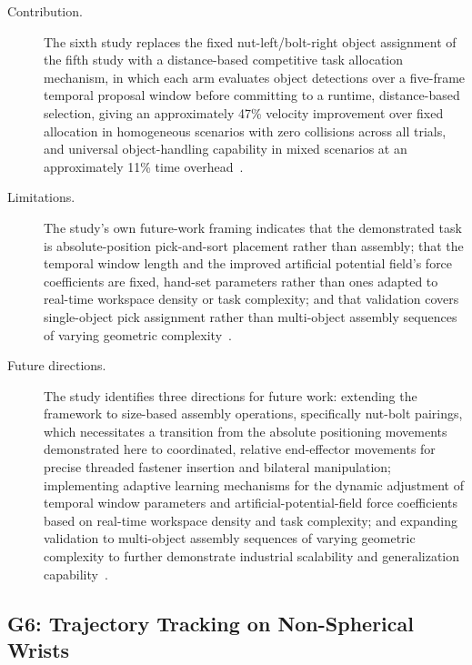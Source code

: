 \begin{description}
    \item[Contribution.] The sixth study replaces the fixed nut-left/bolt-right object assignment of
    the fifth study with a distance-based competitive task allocation mechanism, in which each arm
    evaluates object detections over a five-frame temporal proposal window before committing to a
    runtime, distance-based selection, giving an approximately 47\% velocity improvement over fixed
    allocation in homogeneous scenarios with zero collisions across all trials, and universal
    object-handling capability in mixed scenarios at an approximately 11\% time
    overhead~\citep{sk2025competitive}.

    \item[Limitations.] The study's own future-work framing indicates that the demonstrated task is
    absolute-position pick-and-sort placement rather than assembly; that the temporal window length
    and the improved artificial potential field's force coefficients are fixed, hand-set parameters
    rather than ones adapted to real-time workspace density or task complexity; and that validation
    covers single-object pick assignment rather than multi-object assembly sequences of varying
    geometric complexity~\citep{sk2025competitive}.

    \item[Future directions.] The study identifies three directions for future work: extending the
    framework to size-based assembly operations, specifically nut-bolt pairings, which necessitates a
    transition from the absolute positioning movements demonstrated here to coordinated, relative
    end-effector movements for precise threaded fastener insertion and bilateral manipulation;
    implementing adaptive learning mechanisms for the dynamic adjustment of temporal window
    parameters and artificial-potential-field force coefficients based on real-time workspace density
    and task complexity; and expanding validation to multi-object assembly sequences of varying
    geometric complexity to further demonstrate industrial scalability and generalization
    capability~\citep{sk2025competitive}.
\end{description}

\subsection{G6: Trajectory Tracking on Non-Spherical Wrists}\label{sec:concl_g6}

